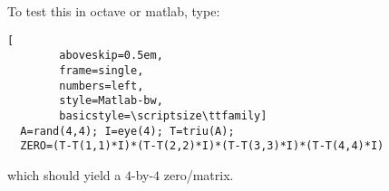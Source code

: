 \begin{example-non}
  To test this  in octave or matlab, type:

  \begin{center}
    \begin{minipage}{\linewidth}
      \addtolength{\linewidth}{-7em}
      \begin{lstlisting}[
        aboveskip=0.5em,
        frame=single,
        numbers=left,
        style=Matlab-bw,
        basicstyle=\scriptsize\ttfamily]
  A=rand(4,4); I=eye(4); T=triu(A);
  ZERO=(T-T(1,1)*I)*(T-T(2,2)*I)*(T-T(3,3)*I)*(T-T(4,4)*I)
      \end{lstlisting}
      \addtolength{\linewidth}{+7em}
    \end{minipage}
  \end{center}

  which should yield a $4$-by-$4$ zero\-/matrix.
\end{example-non}

